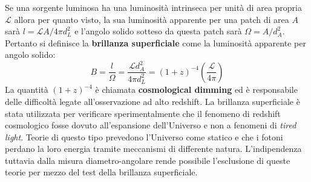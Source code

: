 Se una sorgente luminosa ha una luminosità intrinseca per unità di area propria $\mathcal{L}$ allora per quanto visto, la sua luminosità apparente per una patch di area $A$ sarà $l = \mathcal L A/4\pi d_L^2$ e l'angolo solido sotteso da questa patch sarà $\Omega = A/d_A^2$. Pertanto si definisce la \textbf{brillanza superficiale} come la luminosità apparente per angolo solido:
\begin{equation}
    B = \frac{l}{\Omega} = \frac{\mathcal L d_A^2}{4\pi d_L^2} = (1+z)^{-4}\left( \frac{\mathcal L}{4\pi}\right)
    \label{eq.brillanza_superficiale}
\end{equation}
La quantità $(1+z)^{-4}$ è chiamata \textbf{cosmological dimming} ed è responsabile delle difficoltà legate all'osservazione ad alto redshift. La brillanza superficiale è stata utilizzata per verificare sperimentalmente che il fenomeno di redshift cosmologico fosse dovuto all'espansione dell'Universo e non a fenomeni di \textit{tired light}. Teorie di questo tipo prevedono l'Universo come statico e che i fotoni perdano la loro energia tramite meccanismi di differente natura. L'indipendenza tuttavia dalla misura diametro-angolare rende possibile l'esclusione di queste teorie per mezzo del test della brillanza superficiale. 